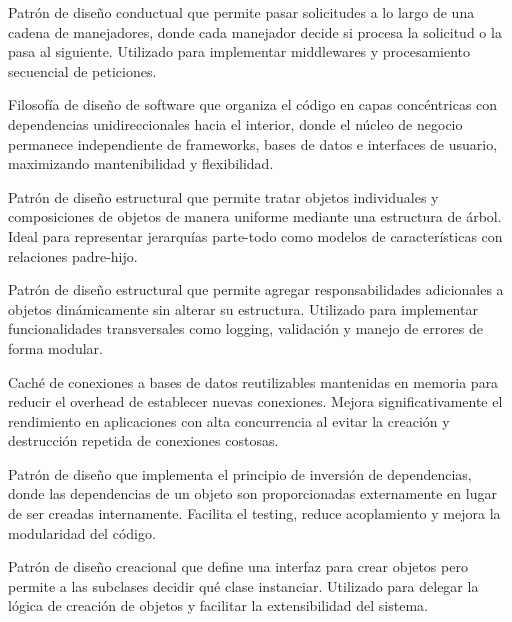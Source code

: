 \begin{description}[style=nextline,leftmargin=0pt]
    \item[Chain of Responsibility (Cadena de Responsabilidad)]
    Patrón de diseño conductual que permite pasar solicitudes a lo largo de una cadena de manejadores, donde cada manejador decide si procesa la solicitud o la pasa al siguiente. Utilizado para implementar middlewares y procesamiento secuencial de peticiones.
    
    \item[Clean Architecture]
    Filosofía de diseño de software que organiza el código en capas concéntricas con dependencias unidireccionales hacia el interior, donde el núcleo de negocio permanece independiente de frameworks, bases de datos e interfaces de usuario, maximizando mantenibilidad y flexibilidad.
    
    \item[Composite (Compuesto)]
    Patrón de diseño estructural que permite tratar objetos individuales y composiciones de objetos de manera uniforme mediante una estructura de árbol. Ideal para representar jerarquías parte-todo como modelos de características con relaciones padre-hijo.
    
    \item[Decorator (Decorador)]
    Patrón de diseño estructural que permite agregar responsabilidades adicionales a objetos dinámicamente sin alterar su estructura. Utilizado para implementar funcionalidades transversales como logging, validación y manejo de errores de forma modular.
    
    \item[Pool de Conexiones]
    Caché de conexiones a bases de datos reutilizables mantenidas en memoria para reducir el overhead de establecer nuevas conexiones. Mejora significativamente el rendimiento en aplicaciones con alta concurrencia al evitar la creación y destrucción repetida de conexiones costosas.
    
    \item[Dependency Injection (Inversión de Dependencias)]
    Patrón de diseño que implementa el principio de inversión de dependencias, donde las dependencias de un objeto son proporcionadas externamente en lugar de ser creadas internamente. Facilita el testing, reduce acoplamiento y mejora la modularidad del código.
    
    \item[Factory Method (Método de Fábrica)]
    Patrón de diseño creacional que define una interfaz para crear objetos pero permite a las subclases decidir qué clase instanciar. Utilizado para delegar la lógica de creación de objetos y facilitar la extensibilidad del sistema.
    

\end{description}
